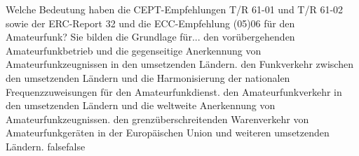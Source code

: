     {Welche Bedeutung haben die CEPT-Empfehlungen T/R 61-01 und T/R 61-02 sowie der ERC-Report 32 und die ECC-Empfehlung (05)06 für den Amateurfunk? Sie bilden die Grundlage für...}
    {den vorübergehenden Amateurfunkbetrieb und die gegenseitige Anerkennung von Amateurfunkzeugnissen in den umsetzenden Ländern.}
    {den Funkverkehr zwischen den umsetzenden Ländern und die Harmonisierung der nationalen Frequenzzuweisungen für den Amateurfunkdienst.}
    {den Amateurfunkverkehr in den umsetzenden Ländern und die weltweite Anerkennung von Amateurfunkzeugnissen.}
    {den grenzüberschreitenden Warenverkehr von Amateurfunkgeräten in der Europäischen Union und weiteren umsetzenden Ländern.}
    {false}{false}